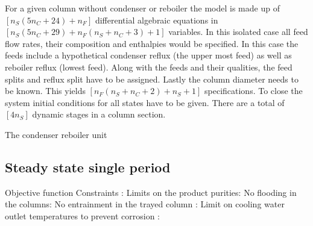     For a given column without condenser or reboiler the model is made up of $[n_S (5n_C + 24) + n_F]$
    differential algebraic equations in $[n_S (5n_C + 29) + n_F (n_S + n_C + 3) + 1]$ variables. In this
    isolated case all feed flow rates, their composition and enthalpies would be specified. In this case
    the feeds include a hypothetical condenser reflux (the upper most feed) as well as reboiler reflux
    (lowest feed). Along with the feeds and their qualities, the feed splits and reflux split have to be
    assigned. Lastly the column diameter needs to be known. This yields $[n_F (n_S + n_C + 2) + n_S + 1]$
    specifications. To close the system initial conditions for all states have to be given. There
    are a total of $[4 n_S ]$ dynamic stages in a column section.

    The condenser reboiler unit

    \subsection{Steady state single period}
    \label{chp:optexample:ss_single_perid}
    Objective function
    Constraints :
    Limits on the product purities:
    No flooding in the columns:
    No entrainment in the trayed column :
    Limit on cooling water outlet temperatures to prevent corrosion :


